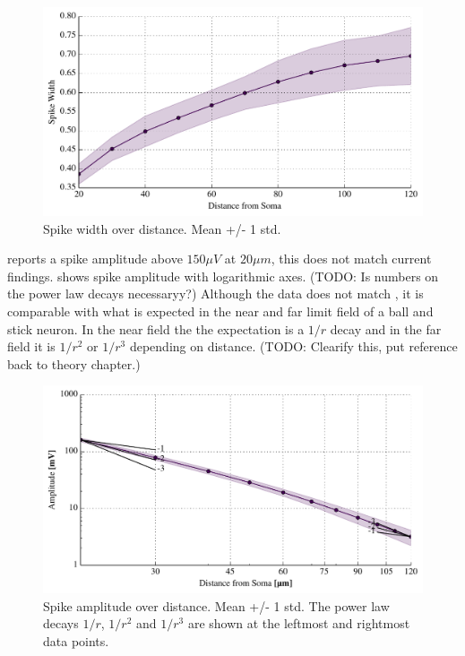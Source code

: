 \documentclass[altfont, fleqn]{uiophd}
\renewcommand{\cref}[1]{{\color{viridis_03}\mycref{#1}}}
\begin{document}
\begin{figure}[thp]
\centering
\includegraphics[width=\textwidth]{images/4_1/disc_spike_width_II.pdf}
\caption{Spike width over distance. Mean +/- 1 std.}
\label{fig:4_1_spike_width}
\end{figure}

\textcite{pettersen_amplitude_2008} reports a spike amplitude above $150\mu V$ at 
$20\mu m$, this does not match current findings.  
\cref{fig:4_1_spike_amp} shows spike amplitude with logarithmic axes.  
(TODO: Is numbers on the power law decays necessaryy?) Although 
the data does not match \textcite{pettersen_amplitude_2008}, 
it is comparable with what is
expected in the near and far limit field of a ball and stick neuron.
In the near field the the expectation is a $1/r$ decay and in the far field
it is  $1/r^2$ or $1/r^3$ depending on distance. (TODO: Clearify this, put reference
back to theory chapter.)

\begin{figure}[thp]
\centering
\includegraphics[width=\textwidth]{images/4_1/disc_spike_amps_I_log.pdf}
\caption{Spike amplitude over distance. Mean +/- 1 std. The power law
decays $1/r$, $1/r^2$ and $1/r^3$ are shown at the leftmost and rightmost
data points.}
\label{fig:4_1_spike_amp}
\end{figure}
\end{document}
